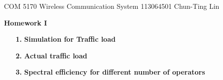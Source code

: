 \documentclass[letterpaper,12pt]{article}
\begin{document}
  \noindent COM 5170 Wireless Communication System \hfill 113064501  Chun-Ting Lin \\

  \begin{center}
    {\bf \large  Homework I}
  \end{center}


  \begin{enumerate}
    \item[{\bf 1. }]  \textbf{Simulation for Traffic load} \hfill \\
      
    \item[{\bf 2. }]  \textbf{Actual traffic load} \hfill \\
      
    \item[{\bf 3. }]  \textbf{Spectral efficiency for different number of operators} \hfill \\
      
  \end{enumerate}
\end{document}
